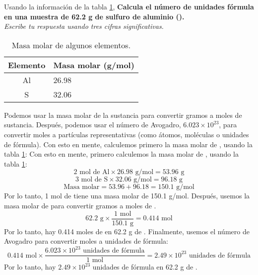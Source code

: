 \begin{multicols}{2}
    Usando la información de la tabla \ref{tab:q004},
\textbf{Calcula el número de unidades fórmula en una muestra de 62.2 g de sulfuro de aluminio ().}\\
\emph{Escribe tu respuesta usando tres cifras significativas.}


    \begin{table}[H]
        \centering
        \caption{Masa molar de algunos elementos.}
        \label{tab:q004}
        \begin{tabular}{c|p{2.2cm}}
            \textbf{Elemento} & \textbf{Masa molar (g/mol)} \\\midrule
            Al                & 26.98                       \\\hline
            S                 & 32.06                       \\\hline
            \bottomrule
        \end{tabular}
    \end{table}

\end{multicols}

\begin{solutionbox}{10cm}
    Podemos usar la masa molar de la sustancia para convertir gramos a moles de sustancia. Después, podemos usar el número de Avogadro, $6.023 \times 10^{23}$, para convertir moles a partículas representativas (como átomos, moléculas o unidades de fórmula). Con esto en mente, calculemos primero la masa molar de , usando la tabla \ref{tab:q004}:
    Con esto en mente, primero calculemos la masa molar de , usando la tabla \ref{tab:q004}:
    \[2 \text{ mol de Al} \times 26.98 \text{ g/mol} = 53.96 \text{ g}\]
    \[3 \text{ mol de S} \times 32.06 \text{ g/mol} = 96.18 \text{ g}\]
    \[\text{Masa molar} = 53.96 + 96.18 = 150.1 \text{ g/mol}\]
    Por lo tanto, 1 mol de  tiene una masa molar de 150.1 g/mol.
    Después, usemos la masa molar de  para convertir gramos a moles de .
\[62.2 \text{ g} \times \frac{1 \text{ mol}}{150.1 \text{ g}} = 0.414 \text{ mol}\]
    Por lo tanto, hay 0.414 moles de  en 62.2 g de .
    Finalmente, usemos el número de Avogadro para convertir moles a unidades de fórmula:
    \[0.414 \text{ mol} \times \frac{6.023 \times 10^{23} \text{ unidades de fórmula}}{1 \text{ mol}} = 2.49 \times 10^{23} \text{ unidades de fórmula}\]
    Por lo tanto, hay $2.49 \times 10^{23}$ unidades de fórmula en 62.2 g de .
\end{solutionbox}